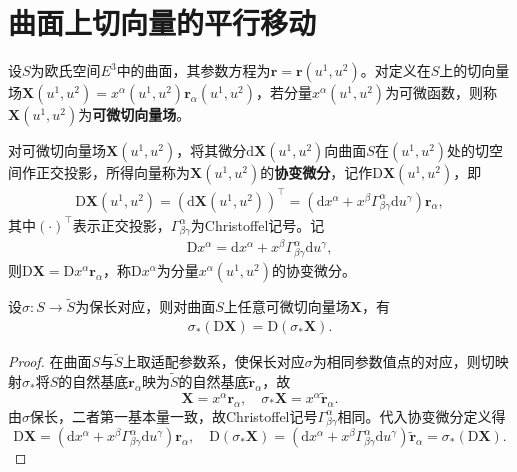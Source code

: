 \documentclass[../../main.tex]{subfiles}%
\begin{document}
\section{曲面上切向量的平行移动}

\begin{definition}
设$S$为欧氏空间$E^3$中的曲面，其参数方程为$\boldsymbol{r}=\boldsymbol{r}(u^1,u^2)$。对定义在$S$上的切向量场$\boldsymbol{X}(u^1,u^2)=x^\alpha(u^1,u^2)\boldsymbol{r}_\alpha(u^1,u^2)$，若分量$x^\alpha(u^1,u^2)$为可微函数，则称$\boldsymbol{X}(u^1,u^2)$为\textbf{可微切向量场}。
\end{definition}

\begin{definition}
对可微切向量场$\boldsymbol{X}(u^1,u^2)$，将其微分$\mathrm{d}\boldsymbol{X}(u^1,u^2)$向曲面$S$在$(u^1,u^2)$处的切空间作正交投影，所得向量称为$\boldsymbol{X}(u^1,u^2)$的\textbf{协变微分}，记作$\mathrm{D}\boldsymbol{X}(u^1,u^2)$，即
\begin{align}
\mathrm{D}\boldsymbol{X}(u^1,u^2)=(\mathrm{d}\boldsymbol{X}(u^1,u^2))^\top=(\mathrm{d}x^\alpha+x^\beta\Gamma_{\beta\gamma}^\alpha\mathrm{d}u^\gamma)\boldsymbol{r}_\alpha,
\label{eq:cov_diff_vec}
\end{align}
其中$(\cdot)^\top$表示正交投影，$\Gamma_{\beta\gamma}^\alpha$为Christoffel记号。记
\begin{align}
\mathrm{D}x^\alpha=\mathrm{d}x^\alpha+x^\beta\Gamma_{\beta\gamma}^\alpha\mathrm{d}u^\gamma,
\label{eq:cov_diff_comp}
\end{align}
则$\mathrm{D}\boldsymbol{X}=\mathrm{D}x^\alpha \boldsymbol{r}_\alpha$，称$\mathrm{D}x^\alpha$为分量$x^\alpha(u^1,u^2)$的协变微分。
\end{definition}

\begin{theorem}
设$\sigma:S\to\tilde{S}$为保长对应，则对曲面$S$上任意可微切向量场$\boldsymbol{X}$，有
\begin{align}
\sigma_*(\mathrm{D}\boldsymbol{X})=\mathrm{D}(\sigma_*\boldsymbol{X}).
\label{eq:cov_diff_isometry}
\end{align}
\end{theorem}

\begin{proof}

在曲面$S$与$\tilde{S}$上取适配参数系，使保长对应$\sigma$为相同参数值点的对应，则切映射$\sigma_*$将$S$的自然基底$\boldsymbol{r}_\alpha$映为$\tilde{S}$的自然基底$\tilde{\boldsymbol{r}}_\alpha$，故
\[
\boldsymbol{X}=x^\alpha\boldsymbol{r}_\alpha,\quad \sigma_*\boldsymbol{X}=x^\alpha\tilde{\boldsymbol{r}}_\alpha.
\]
由$\sigma$保长，二者第一基本量一致，故Christoffel记号$\Gamma_{\beta\gamma}^\alpha$相同。代入协变微分定义得
\[
\mathrm{D}\boldsymbol{X}=(\mathrm{d}x^\alpha+x^\beta\Gamma_{\beta\gamma}^\alpha\mathrm{d}u^\gamma)\boldsymbol{r}_\alpha,\quad \mathrm{D}(\sigma_*\boldsymbol{X})=(\mathrm{d}x^\alpha+x^\beta\Gamma_{\beta\gamma}^\alpha\mathrm{d}u^\gamma)\tilde{\boldsymbol{r}}_\alpha=\sigma_*(\mathrm{D}\boldsymbol{X}).
\]

\end{proof}
\end{document}
